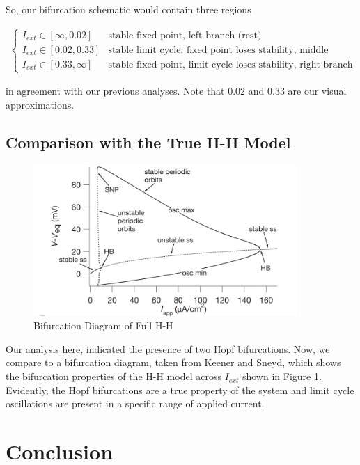 \documentclass{article}
\begin{document}
So, our bifurcation schematic would contain three regions

\begin{align*}
    \begin{cases}
    I_{ext} \in [\infty, 0.02] & \text{stable fixed point, left branch (rest)} \\
    I_{ext} \in [0.02, 0.33] &  \text{stable limit cycle, fixed point loses stability, middle branch} \\
    I_{ext} \in [0.33, \infty] & \text{stable fixed point, limit cycle loses stability, right branch (excited)}
    \end{cases}
\end{align*}

in agreement with our previous analyses. Note that 0.02 and 0.33 are our visual approximations. 

\subsection{Comparison with the True H-H Model}

\begin{figure}
\centering
	\centering
	\includegraphics[width=10cm]{true.png}
	\caption{Bifurcation Diagram of Full H-H\cite{keener}}
	\label{fig:big_keen}
\end{figure}

Our analysis here, indicated the presence of two Hopf bifurcations. Now, we compare to a bifurcation diagram, taken from Keener and Sneyd, which shows the bifurcation properties of the H-H model across $I_{ext}$ shown in Figure \ref{fig:big_keen}. Evidently, the Hopf bifurcations are a true property of the system and limit cycle oscillations are present in a specific range of applied current. 

\section{Conclusion}
\end{document}
